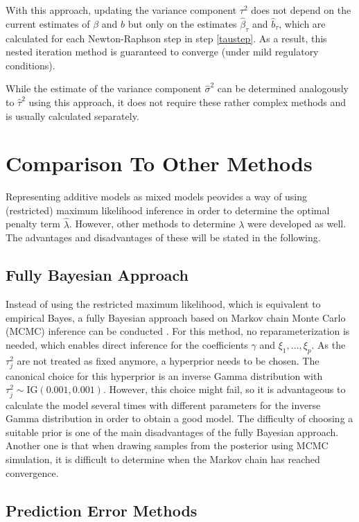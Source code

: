\documentclass[12pt]{article}
\begin{document}
With this approach, updating the variance component $\tau^2$ does not depend on the current estimates of $\beta$ and $b$ but only on the estimates $\hat{\beta}_{\tau}$ and $\hat{b}_\tau$, which are calculated for each Newton-Raphson step in step \ref{taustep}. As a result, this nested iteration method is guaranteed to converge (under mild regulatory conditions).

While the estimate of the variance component $\hat{\sigma}^2$ can be determined analogously to $\hat{\tau}^2$ using this approach, it does not require these rather complex methods and is usually calculated separately.

\section{Comparison To Other Methods} %

Representing additive models as mixed models peovides a way of using (restricted) maximum likelihood inference in order to determine the optimal penalty term $\hat{\lambda}$. However, other methods to determine $\lambda$ were developed as well. The advantages and disadvantages of these will be stated in the following.

\subsection{Fully Bayesian Approach}

Instead of using the restricted maximum likelihood, which is equivalent to empirical Bayes, a fully Bayesian approach based on Markov chain Monte Carlo (MCMC) inference can be conducted \cite{kneib2006mixed}. For this method, no reparameterization is needed, which enables direct inference for the coefficients $\gamma$ and $\xi_1,...,\xi_p$. 
As the $\tau_j^2$ are not treated as fixed anymore, a hyperprior needs to be chosen. The canonical choice for this hyperprior is an inverse Gamma distribution with $\tau^2_j \sim \text{IG}(0.001,0.001)$. However, this choice might fail, so it is advantageous to calculate the model several times with different parameters for the inverse Gamma distribution in order to obtain a good model. The difficulty of choosing a suitable prior is one of the main disadvantages of the fully Bayesian approach. Another one is that when drawing samples from the posterior using MCMC simulation, it is difficult to determine when the Markov chain has reached convergence.


\subsection{Prediction Error Methods}
\end{document}
